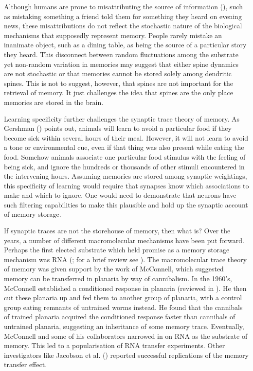 \documentclass[
  jou,
  floatsintext,
  longtable,
  nolmodern,
  notxfonts,
  notimes,
  donotrepeattitle,
  colorlinks=true,linkcolor=blue,citecolor=blue,urlcolor=blue]{apa7}
\begin{document}
Although humans are prone to misattributing the source of information
(), such as
mistaking something a friend told them for something they heard on
evening news, these misattributions do not reflect the stochastic nature
of the biological mechanisms that supposedly represent memory. People
rarely mistake an inanimate object, such as a dining table, as being the
source of a particular story they heard. This disconnect between random
fluctuations among the substrate yet non-random variation in memories
may suggest that either spine dynamics are not stochastic or that
memories cannot be stored solely among dendritic spines. This is not to
suggest, however, that spines are not important for the retrieval of
memory. It just challenges the idea that spines are the only place
memories are stored in the brain.

Learning specificity further challenges the synaptic trace theory of
memory. As Gershman ()
points out, animals will learn to avoid a particular food if they become
sick within several hours of their meal. However, it will not learn to
avoid a tone or environmental cue, even if that thing was also present
while eating the food. Somehow animals associate one particular food
stimulus with the feeling of being sick, and ignore the hundreds or
thousands of other stimuli encountered in the intervening hours.
Assuming memories are stored among synaptic weightings, this specificity
of learning would require that synapses know which associations to make
and which to ignore. One would need to demonstrate that neurons have
such filtering capabilities to make this plausible and hold up the
synaptic account of memory storage.

If synaptic traces are not the storehouse of memory, then what is? Over
the years, a number of different macromolecular mechanisms have been put
forward. Perhaps the first elected substrate which held promise as a
memory storage mechanism was RNA
(; for a brief
review see ). The macromolecular trace theory of memory was given
support by the work of McConnell, which suggested memory can be
transferred in planaria by way of cannibalism. In the 1960's, McConnell
established a conditioned response in planaria (reviewed in
). He then cut
these planaria up and fed them to another group of planaria, with a
control group eating remnants of untrained worms instead. He found that
the cannibals of trained planaria acquired the conditioned response
faster than cannibals of untrained planaria, suggesting an inheritance
of some memory trace. Eventually, McConnell and some of his
collaborators narrowed in on RNA as the substrate of memory. This led to
a popularisation of RNA transfer experiments. Other investigators like
Jacobson et al. () reported
successful replications of the memory transfer effect.~
\end{document}
